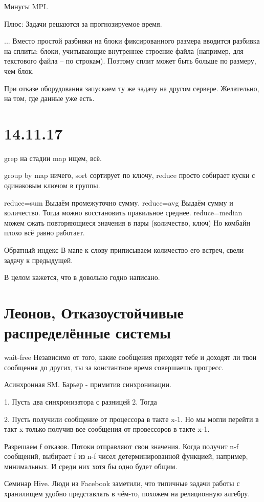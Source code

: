 Минусы MPI.

Плюс: Задачи решаются за прогнозируемое время.


...
Вместо простой разбивки на блоки фиксированного размера вводится разбивка на сплиты: блоки, учитывающие внутреннее строение файла (например, для текстового файла -- по строкам). Поэтому сплит может быть больше по размеру, чем блок.

При отказе оборудования запускаем ту же задачу на другом сервере. Желательно, на том, где данные уже есть. 

\section{14.11.17}
grep на стадии map ищем, всё.

group by
map ничего, sort сортирует по ключу, reduce просто собирает куски с одинаковым ключом в группы.

reduce=sum
Выдаём промежуточно сумму.
reduce=avg
Выдаём сумму и количество. Тогда можно восстановить правильное среднее.
reduce=median
можем сжать повторяющиеся значения в пары (количество, ключ)
Но комбайн плохо всё равно работает.


Обратный индекс
В мапе к слову приписываем количество его встреч, свели задачу к предыдущей.

В целом кажется, что в  довольно годно написано.

\section{Леонов, Отказоустойчивые распределённые системы}
wait-free
Независимо от того, какие сообщения приходят тебе и доходят ли твои сообщения до других, ты за константное время совершаешь прогресс.

Асинхронная SM. Барьер - примитив синхронизации.

1. Пусть два синхронизатора с разницей 2. Тогда 

2. Пусть получили сообщение от процессора в такте x-1. Но мы могли перейти в такт x только получив все сообщения от провессоров в такте x-1.

Разрешаем f отказов. Потоки отправляют свои значения. Когда получит n-f сообщений, выбирает f из n-f чисел детерминированной функцией, например, минимальных. И среди них хотя бы одно будет общим.

Семинар
Hive. Люди из Facebook заметили, что типичные задачи работы с хранилищем удобно представлять в чём-то, похожем на реляционную алгебру.

